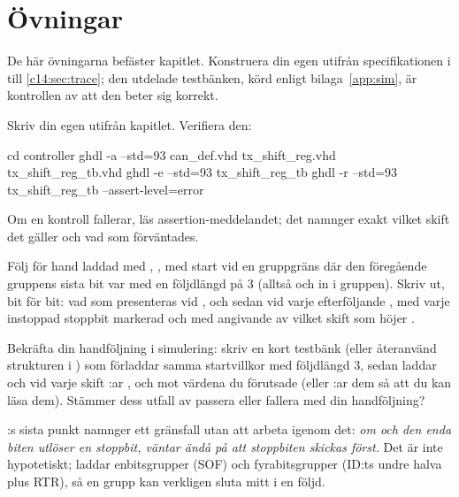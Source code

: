 
\section{Övningar}
\label{c14:sec:exercises}

\begin{aside}
De här övningarna befäster kapitlet. Konstruera din egen  utifrån
specifikationen i  till \ref{c14:sec:trace}; den utdelade testbänken, körd
enligt bilaga~\ref{app:sim}, är kontrollen av att den beter sig korrekt.
\end{aside}

\label{c14:ex:txsr}
Skriv din egen  utifrån kapitlet. Verifiera den:

\begin{shell}
cd controller
ghdl -a --std=93 can_def.vhd tx_shift_reg.vhd tx_shift_reg_tb.vhd
ghdl -e --std=93 tx_shift_reg_tb
ghdl -r --std=93 tx_shift_reg_tb --assert-level=error
\end{shell}

Om en kontroll fallerar, läs assertion-meddelandet; det namnger exakt vilket skift det gäller och
vad som förväntades.

\label{c14:ex:trace}
 Följ för hand  laddad med ,
, med start vid en gruppgräns där den föregående gruppens sista bit var 
med en följdlängd på 3 (alltså  och  in i gruppen). Skriv
ut, bit för bit: vad som presenteras vid , och sedan vid varje efterföljande
, med varje instoppad stoppbit markerad och med angivande av vilket skift som höjer
.

 Bekräfta din handföljning i simulering: skriv en kort testbänk (eller återanvänd strukturen
i ) som förladdar samma startvillkor med följdlängd 3, sedan laddar
 och vid varje skift :ar ,  och 
mot värdena du förutsade (eller :ar dem så att du kan läsa dem). Stämmer dess utfall av
passera eller fallera med din handföljning?

\label{c14:ex:onebit}
:s sista punkt namnger ett gränsfall utan att arbeta igenom det: \emph{om
 och den enda biten utlöser en stoppbit, väntar  ändå på att
stoppbiten skickas först.} Det är inte hypotetiskt;  laddar enbitsgrupper (SOF)
och fyrabitsgrupper (ID:ts undre halva plus RTR), så en grupp kan verkligen sluta mitt i en följd.

